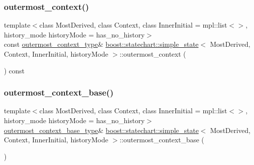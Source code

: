 \mbox{\label{classboost_1_1statechart_1_1simple__state_aea19005dfbeaca465dea79c74799544c}} 
\subsubsection{\texorpdfstring{outermost\+\_\+context()}{outermost\_context()}\hspace{0.1cm}{\footnotesize\ttfamily [2/2]}}
{\footnotesize\ttfamily template$<$class Most\+Derived, class Context, class Inner\+Initial = mpl\+::list$<$$>$, history\+\_\+mode history\+Mode = has\+\_\+no\+\_\+history$>$ \\
const \mbox{\hyperlink{classboost_1_1statechart_1_1simple__state_a25f32527ab9e99c9ae75c723e4be9cb6}{outermost\+\_\+context\+\_\+type}}\& \mbox{\hyperlink{classboost_1_1statechart_1_1simple__state}{boost\+::statechart\+::simple\+\_\+state}}$<$ Most\+Derived, Context, Inner\+Initial, history\+Mode $>$\+::outermost\+\_\+context (\begin{DoxyParamCaption}{ }\end{DoxyParamCaption}) const\hspace{0.3cm}{\ttfamily [inline]}}

\mbox{\label{classboost_1_1statechart_1_1simple__state_ac542d3d3b03bf646e4f5726259d1a2b0}} 
\subsubsection{\texorpdfstring{outermost\+\_\+context\+\_\+base()}{outermost\_context\_base()}\hspace{0.1cm}{\footnotesize\ttfamily [1/2]}}
{\footnotesize\ttfamily template$<$class Most\+Derived, class Context, class Inner\+Initial = mpl\+::list$<$$>$, history\+\_\+mode history\+Mode = has\+\_\+no\+\_\+history$>$ \\
\mbox{\hyperlink{classboost_1_1statechart_1_1simple__state_a50f21d7a7d6632eb34430e74cbad3197}{outermost\+\_\+context\+\_\+base\+\_\+type}}\& \mbox{\hyperlink{classboost_1_1statechart_1_1simple__state}{boost\+::statechart\+::simple\+\_\+state}}$<$ Most\+Derived, Context, Inner\+Initial, history\+Mode $>$\+::outermost\+\_\+context\+\_\+base (\begin{DoxyParamCaption}{ }\end{DoxyParamCaption})\hspace{0.3cm}{\ttfamily [inline]}}

